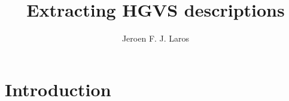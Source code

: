 \documentclass[slidestop]{beamer}
\title{Extracting HGVS descriptions}
\author{Jeroen F. J. Laros}
\begin{document}
\newcommand{\algorithmexample}[1]{
  \begin{figure}[]
    \begin{center}
      \fbox{
        \setlength{\unitlength}{1pt}
        \linethickness{3pt}
        \begin{picture}(300, 60)(0, 0)
          \put(0, 10){\line(1, 0){30}} %
          \put(30, 10){\color{red}\line(1, 0){240}\color{white}} %
          \put(270, 10){\line(1, 0){30}}
          \put(0, 14){{\scriptsize observed}}

          \put(0, 40){\line(1, 0){30}} %
          \put(30, 40){\color{green}\line(1, 0){240}\color{white}} %
          \put(270, 40){\line(1, 0){30}}
          \put(0, 46){{\scriptsize reference}}
          \put(30, 30){{\scriptsize $8$}}
          \put(270, 30){{\scriptsize $98$}}

          \ifthenelse{\equal{#1}{1}}{
            \drawcurve(50, 40)(55, 35)(155, 25)(255, 15)(260, 10)
            \drawcurve(260, 40)(255, 35)(155, 25)(55, 15)(50, 10)
          }{}
          \ifthenelse{#1>1}{
            \put(50, 10){\line(1, 0){210}} %
            \put(50, 40){\line(1, 0){210}} %
          }{}
          \ifthenelse{#1>2}{
            \put(35, 10){\line(1, 0){10}}
            \put(35, 40){\line(1, 0){10}}
          }{}
        \end{picture}
      }
    \end{center}
    \caption{How would a human do it?}
  \end{figure}
}


\bodytemplate

\section{Introduction}
\end{document}
